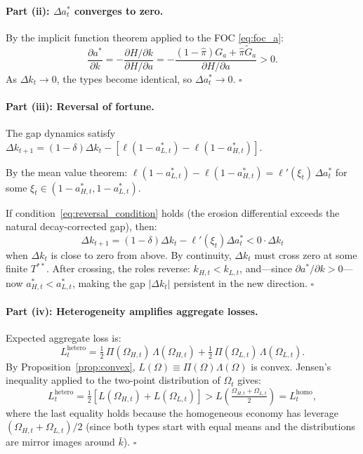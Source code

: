 \documentclass[12pt]{article}
\newcommand{\hpi}{\hat{\pi}}
\begin{document}
\paragraph{Part (ii): $\Delta a_t^*$ converges to zero.}

By the implicit function theorem applied to the FOC \eqref{eq:foc_a}:
\[
\frac{\partial a^*}{\partial k} = -\frac{\partial H/\partial k}{\partial H/\partial a}
= -\frac{(1-\hpi)G_a + \hpi\tilde G_a}{\partial H/\partial a} > 0.
\]
As $\Delta k_t \to 0$, the types become identical, so $\Delta a_t^* \to 0$. $\square$

\paragraph{Part (iii): Reversal of fortune.}

The gap dynamics satisfy $\Delta k_{t+1} = (1-\delta)\Delta k_t - [\ell(1-a_{L,t}^*) - \ell(1-a_{H,t}^*)]$.

By the mean value theorem: $\ell(1-a_{L,t}^*) - \ell(1-a_{H,t}^*) = \ell'(\xi_t)\,\Delta a_t^*$
for some $\xi_t \in (1-a_{H,t}^*, 1-a_{L,t}^*)$.

If condition~\eqref{eq:reversal_condition} holds (the erosion differential exceeds
the natural decay-corrected gap), then:
\[
\Delta k_{t+1} = (1-\delta)\Delta k_t - \ell'(\xi_t)\Delta a_t^* < 0 \cdot \Delta k_t
\]
when $\Delta k_t$ is close to zero from above. By continuity, $\Delta k_t$ must cross zero
at some finite $T^{**}$. After crossing, the roles reverse:
$k_{H,t} < k_{L,t}$, and---since $\partial a^*/\partial k > 0$---now
$a_{H,t}^* < a_{L,t}^*$, making the gap $|\Delta k_t|$ persistent in the new direction.
$\square$

\paragraph{Part (iv): Heterogeneity amplifies aggregate losses.}

Expected aggregate loss is:
\[
L_t^{\text{hetero}} = \tfrac{1}{2}\,\Pi(\Omega_{H,t})\,\Lambda(\Omega_{H,t}) +
\tfrac{1}{2}\,\Pi(\Omega_{L,t})\,\Lambda(\Omega_{L,t}).
\]
By Proposition~\ref{prop:convex}, $L(\Omega) \equiv \Pi(\Omega)\Lambda(\Omega)$ is convex. Jensen's
inequality applied to the two-point distribution of $\Omega_t$ gives:
\[
L_t^{\text{hetero}} = \tfrac{1}{2}[L(\Omega_{H,t}) + L(\Omega_{L,t})]
> L\!\left(\tfrac{\Omega_{H,t}+\Omega_{L,t}}{2}\right) = L_t^{\text{homo}},
\]
where the last equality holds because the homogeneous economy has leverage
$(\Omega_{H,t}+\Omega_{L,t})/2$ (since both types start with equal means
and the distributions are mirror images around $\bar k$). $\square$
\end{document}
